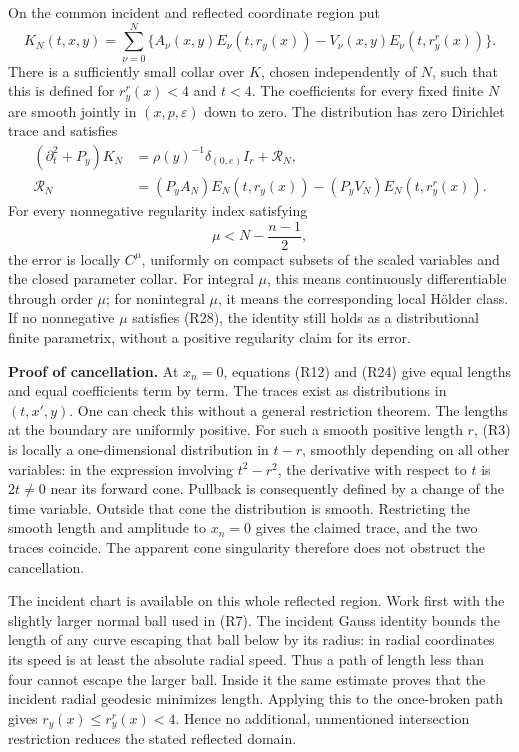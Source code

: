 \documentclass[
  11pt,
]{article}
\begin{document}
On the common incident and reflected coordinate region put \[
 K_N(t,x,y)=\sum_{\nu=0}^N
       \{A_\nu(x,y)E_\nu(t,r_y(x))
                   -V_\nu(x,y)E_\nu(t,r_y^r(x))\}.          \tag{R26}
\] There is a sufficiently small collar over \(K\), chosen independently
of \(N\), such that this is defined for \(r_y^r(x)<4\) and \(t<4\). The
coefficients for every fixed finite \(N\) are smooth jointly in
\((x,p,\varepsilon)\) down to zero. The distribution has zero Dirichlet
trace and satisfies \[
\begin{split}
 (\partial_t^2+P_y)K_N
   &=\rho(y)^{-1}\delta_{(0,e)}I_r+\mathcal R_N,\\
 \mathcal R_N
   &=(P_yA_N)E_N(t,r_y(x))
                 -(P_yV_N)E_N(t,r_y^r(x)).
\end{split}                                                     \tag{R27}
\] For every nonnegative regularity index satisfying \[
                  \mu<N-\frac{n-1}{2},                       \tag{R28}
\] the error is locally \(C^\mu\), uniformly on compact subsets of the
scaled variables and the closed parameter collar. For integral \(\mu\),
this means continuously differentiable through order \(\mu\); for
nonintegral \(\mu\), it means the corresponding local Hölder class. If
no nonnegative \(\mu\) satisfies (R28), the identity still holds as a
distributional finite parametrix, without a positive regularity claim
for its error.

\textbf{Proof of cancellation.} At \(x_n=0\), equations (R12) and (R24)
give equal lengths and equal coefficients term by term. The traces exist
as distributions in \((t,x',y)\). One can check this without a general
restriction theorem. The lengths at the boundary are uniformly positive.
For such a smooth positive length \(r\), (R3) is locally a
one-dimensional distribution in \(t-r\), smoothly depending on all other
variables: in the expression involving \(t^2-r^2\), the derivative with
respect to \(t\) is \(2t\ne0\) near its forward cone. Pullback is
consequently defined by a change of the time variable. Outside that cone
the distribution is smooth. Restricting the smooth length and amplitude
to \(x_n=0\) gives the claimed trace, and the two traces coincide. The
apparent cone singularity therefore does not obstruct the cancellation.

The incident chart is available on this whole reflected region. Work
first with the slightly larger normal ball used in (R7). The incident
Gauss identity bounds the length of any curve escaping that ball below
by its radius: in radial coordinates its speed is at least the absolute
radial speed. Thus a path of length less than four cannot escape the
larger ball. Inside it the same estimate proves that the incident radial
geodesic minimizes length. Applying this to the once-broken path gives
\(r_y(x)\leq r_y^r(x)<4\). Hence no additional, unmentioned intersection
restriction reduces the stated reflected domain.
\end{document}
